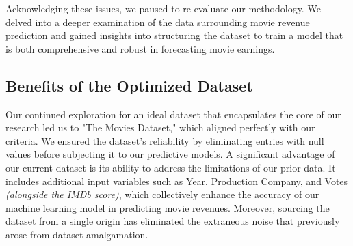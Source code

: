 \documentclass[conference]{IEEEtran}
\begin{document}
        Acknowledging these issues, we paused to re-evaluate our methodology. We delved into a deeper examination of the data surrounding movie revenue prediction and gained insights into structuring the dataset to train a model that is both comprehensive and robust in forecasting movie earnings.
    
    \subsection{Benefits of the Optimized Dataset}
        Our continued exploration for an ideal dataset that encapsulates the core of our research led us to "The Movies Dataset," which aligned perfectly with our criteria. We ensured the dataset's reliability by eliminating entries with null values before subjecting it to our predictive models. A significant advantage of our current dataset is its ability to address the limitations of our prior data. It includes additional input variables such as Year, Production Company, and Votes \textit{(alongside the IMDb score)}, which collectively enhance the accuracy of our machine learning model in predicting movie revenues. Moreover, sourcing the dataset from a single origin has eliminated the extraneous noise that previously arose from dataset amalgamation.
\end{document}
